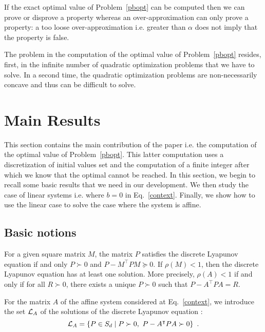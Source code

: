 \documentclass[10pt]{article}
\begin{document}
If the exact optimal value of Problem~\eqref{pbopt} can be computed then we can prove or disprove a property whereas an over-approximation can only prove a property: a too loose over-approximation i.e. greater than $\alpha$ does not imply that the property is false. 

The problem in the computation of the optimal value of Problem~\eqref{pbopt} resides, first, in the infinite number of quadratic optimization problems that we have to solve. In a second time, the quadratic optimization problems are non-necessarily concave and thus can be difficult to solve. 
\section{Main Results}
\label{mainresults}
This section contains the main contribution of the paper i.e. the computation of the optimal value of Problem~\eqref{pbopt}. This latter computation uses a discretization of initial values set and the computation of a finite integer after which we know that the optimal cannot be reached. In this section, we begin to recall some basic results that we need in our development. We then study the case of linear systems i.e. where $b=0$ in Eq.~\eqref{context}. Finally, we show how to use the linear case to solve the case where the system is affine.   
\subsection{Basic notions}

For a given square matrix $M$, the matrix $P$ satisfies the discrete Lyapunov equation if and only $P\succ 0$ and $P-M^\intercal P M\succeq 0$. If $\rho(M)<1$, then the discrete Lyapunov equation has at least one solution. More precisely, $\rho(A)<1$ if and only if for all $R\succ 0$, there exists a unique $P\succ 0$ such that $P-A^\intercal P A=R$. 

For the matrix $A$ of the affine system considered at Eq.~\eqref{context}, we introduce the set $\mathcal{L}_{A}$ of the  solutions  of the discrete Lyapunov equation :
\[
\mathcal{L}_{A}=\{P\in S_d \mid P\succ 0,\ P-A^\intercal P A\succ 0\}\enspace .
\]
\end{document}
